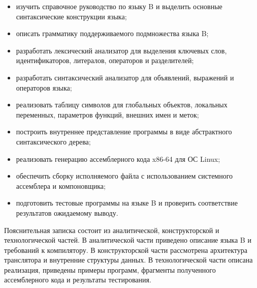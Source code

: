 \begin{itemize}
  \item изучить справочное руководство по языку B и выделить основные синтаксические конструкции языка;
  \item описать грамматику поддерживаемого подмножества языка B;
  \item разработать лексический анализатор для выделения ключевых слов, идентификаторов, литералов, операторов и разделителей;
  \item разработать синтаксический анализатор для объявлений, выражений и операторов языка;
  \item реализовать таблицу символов для глобальных объектов, локальных переменных, параметров функций, внешних имен и меток;
  \item построить внутреннее представление программы в виде абстрактного синтаксического дерева;
  \item реализовать генерацию ассемблерного кода x86-64 для ОС Linux;
  \item обеспечить сборку исполняемого файла с использованием системного ассемблера и компоновщика;
  \item подготовить тестовые программы на языке B и проверить соответствие результатов ожидаемому выводу.
\end{itemize}

Пояснительная записка состоит из аналитической, конструкторской и технологической частей. В аналитической части приведено описание языка B и требований к компилятору. В конструкторской части рассмотрена архитектура транслятора и внутренние структуры данных. В технологической части описана реализация, приведены примеры программ, фрагменты полученного ассемблерного кода и результаты тестирования.
